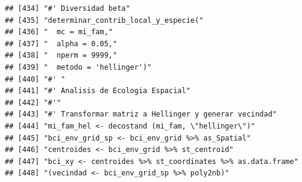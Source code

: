 \documentclass[11pt,]{article}
\begin{document}
\begin{verbatim}
## [434] "#' Diversidad beta"                                                                                                                                                    
## [435] "determinar_contrib_local_y_especie("                                                                                                                                   
## [436] "  mc = mi_fam,"                                                                                                                                                        
## [437] "  alpha = 0.05,"                                                                                                                                                       
## [438] "  nperm = 9999,"                                                                                                                                                       
## [439] "  metodo = 'hellinger')"                                                                                                                                               
## [440] "#' "                                                                                                                                                                   
## [441] "#' Analisis de Ecologia Espacial"                                                                                                                                      
## [442] "#'"                                                                                                                                                                    
## [443] "#' Transformar matriz a Hellinger y generar vecindad"                                                                                                                  
## [444] "mi_fam_hel <- decostand (mi_fam, \"hellinger\")"                                                                                                                       
## [445] "bci_env_grid_sp <- bci_env_grid %>% as_Spatial"                                                                                                                        
## [446] "centroides <- bci_env_grid %>% st_centroid"                                                                                                                            
## [447] "bci_xy <- centroides %>% st_coordinates %>% as.data.frame"                                                                                                             
## [448] "(vecindad <- bci_env_grid_sp %>% poly2nb)"                                                                                                                             

\end{verbatim}
\end{document}
